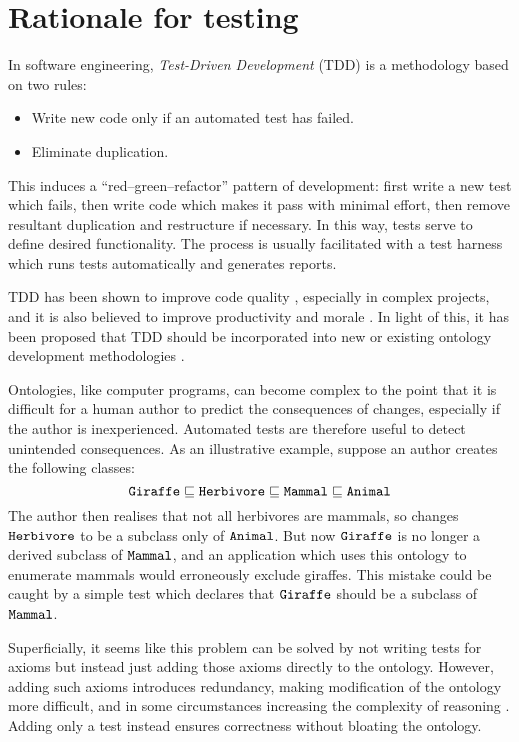 \documentclass[paper.tex]{subfiles}
\begin{document}
\section{Rationale for testing}
\label{sec:rationale}

In software engineering, \emph{Test-Driven Development} (TDD) \cite{Beck:TDD} is a methodology based on two rules:
\begin{itemize}[nosep]
  \item Write new code only if an automated test has failed.
  \item Eliminate duplication.
\end{itemize}
This induces a ``red--green--refactor'' pattern of development: first write a new test which fails, then write code which makes it pass with minimal effort, then remove resultant duplication and restructure if necessary.
In this way, tests serve to define desired functionality.
The process is usually facilitated with a test harness which runs tests automatically and generates reports.

TDD has been shown to improve code quality \cite{Rafique:TDD}, especially in complex projects, and it is also believed to improve productivity and morale \cite{Beck:TDD}.
In light of this, it has been proposed that TDD should be incorporated into new or existing ontology development methodologies \cite{Keet:TDDOntologies}.

Ontologies, like computer programs, can become complex to the point that it is difficult for a human author to predict the consequences of changes, especially if the author is inexperienced.
Automated tests are therefore useful to detect unintended consequences.
As an illustrative example, suppose an author creates the following classes:
\[ \mathtt{Giraffe} \sqsubseteq \mathtt{Herbivore} \sqsubseteq \mathtt{Mammal} \sqsubseteq \mathtt{Animal} \]
The author then realises that not all herbivores are mammals, so changes $\mathtt{Herbivore}$ to be a subclass only of $\mathtt{Animal}$.
But now $\mathtt{Giraffe}$ is no longer a derived subclass of $\mathtt{Mammal}$, and an application which uses this ontology to enumerate mammals would erroneously exclude giraffes.
This mistake could be caught by a simple test which declares that $\mathtt{Giraffe}$ should be a subclass of $\mathtt{Mammal}$.

Superficially, it seems like this problem can be solved by not writing tests for axioms but instead just adding those axioms directly to the ontology.
However, adding such axioms introduces redundancy, making modification of the ontology more difficult, and in some circumstances increasing the complexity of reasoning \cite{Vrandecic:UnitTestsOntologies}.
Adding only a test instead ensures correctness without bloating the ontology.
\end{document}
